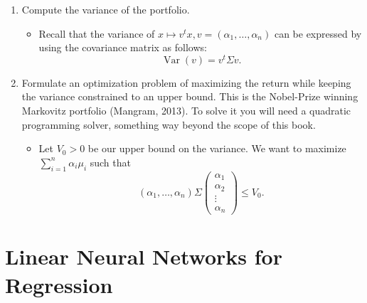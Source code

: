 \documentclass{article}
\begin{document}
\begin{enumerate}
\begin{enumerate}
			\item Compute the variance of the portfolio.
				\begin{itemize}
					\item Recall that the variance of $x \mapsto v^t x, v = (\alpha_1, \dots, \alpha_n)$ can be expressed by using the covariance matrix as follows:
					$$
					\operatorname{Var}(v) = v^t \Sigma v.
					$$
				\end{itemize}
			\item Formulate an optimization problem of maximizing the return while keeping the variance constrained to an upper bound. This is the Nobel-Prize winning Markovitz portfolio (Mangram, 2013). To solve it you will need a quadratic programming solver, something way beyond the scope of this book.
				\begin{itemize}
					\item Let $V_0 > 0$ be our upper bound on the variance. We want to maximize $\sum_{i = 1}^n \alpha_i \mu_i$ such that
					$$
					(\alpha_1, \dots, \alpha_n) \Sigma \begin{pmatrix} \alpha_1 \\ \alpha_2 \\ \vdots \\ \alpha_n \end{pmatrix} \leq V_0.
					$$
				\end{itemize}
		\end{enumerate}
\end{enumerate}

\newpage
\section{Linear Neural Networks for Regression}
\end{document}
